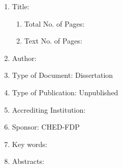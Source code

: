
\begin{enumerate}[leftmargin=0em, itemindent=1.8em]
\item Title: 
	\begin{minipage}[t]{0.75\textwidth}
		\vspace{-1.9em}
		\singlespacing{\DissertationFullTitle}
		\vspace{0.7em}
	\end{minipage}

\begin{enumerate}[leftmargin=1.5em,label*=\arabic*.]	
	
	\item Total No. of Pages: \ifnotUCFormat  {} \fi	%
	\item Text No. of Pages: \ifnotUCFormat   {} %
								\fi
\end{enumerate}


\item Author: \MakeUppercase{\FullNameFamilyFirst}
\item Type of Document: Dissertation
\item Type of Publication: Unpublished

\item Accrediting Institution: 
	\begin{minipage}[t]{0.5\textwidth}
		\vspace{-1.9em}
		\vspace{0.5em}
	\end{minipage}

\item Sponsor: CHED-FDP
\item Key words: 
	\begin{minipage}[t]{0.7\textwidth}
		\vspace{-1.9em}
			\singlespacing{\Keywords}
		\vspace{0.5em}
	\end{minipage}

\item Abstracts:


\end{enumerate}
